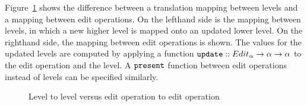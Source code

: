 Figure~\ref{fromLevelToOp} shows the difference between a translation mapping between levels and a mapping between edit operations. On the lefthand side is the mapping between levels, in which a new higher level is mapped onto an updated lower level. On the righthand side, the mapping between edit operations is shown. The values for the updated levels are computed by applying a function
 ${\tt update} :: Edit_\alpha \rightarrow \alpha \rightarrow \alpha$ to the edit operation and the level. A 
 ${\tt present}$ function between edit operations instead of levels can be specified similarly.

\begin{figure}
\begin{small}
\begin{center}
\begin{center}
\begin{small}
\bigskip \noindent
{}
\end{small}
\end{center}\caption{Level to level versus edit operation to edit operation }\label{fromLevelToOp} 
\end{center}
\end{small}
\end{figure}


